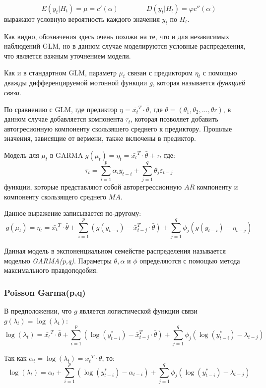 \documentclass[aps,%
12pt,%
final,%
oneside,
onecolumn,%
musixtex, %
superscriptaddress,%
centertags]{article} %
\theoremstyle{plain}
\theoremstyle{definition}
\theoremstyle{remark}
\begin{document}
$$E(y_t|H_t) = \mu = c'(\alpha) \qquad  \qquad D(y_t|H_t) = \varphi c''(\alpha)$$
выражают условную вероятность каждого значения $y_t$ по $H_t$.

Как видно, обозначения здесь очень похожи на те, что и для независимых наблюдений GLM, но в данном случае моделируются условные распределения, что является важным уточнением модели.

Как и в стандартном GLM, параметр $\mu_t$ связан с предиктором $\eta_t$ с помощью дважды дифференцируемой мотонной функции $g$, которая называется \textit{функцией связи}.

По сравнению с GLM, где предиктор $\eta = \bar{x_t}^T \cdot \bar{\theta}$, где $\theta = (\theta_1,\theta_2,\ldots,\theta r)$, в данном случае добавляется компонента $\tau_t$, которая позволяет добавить автогресионную компоненту скользяшего среднего к предиктору. Прошлые значения, зависящие от вермени, также включены в предиктор.

Модель для $\mu_t$ в GARMA $g(\mu_t) = \eta_t = \bar{x_t}^T \cdot \bar{\theta} + \tau_t$ где:
$$\tau_t = \sum\limits_{i=1}^p \alpha_i y_{t-i} +  \sum\limits_{j=1}^q \theta_j \varepsilon_{t-j}$$
функции, которые представляют собой авторегрессионную $AR$ компоненту и компоненту скользящего среднего $MA$.

Данное выражение записывается по-другому:
$$g(\mu_t) = \eta_t = \bar{x_t}^T \cdot \bar{\theta} + \sum\limits_{i=1}^p \left(g(y_{t-i})-\bar{x}_{t-j}^T \cdot \bar{\theta}\right) +  \sum\limits_{j=1}^q \phi_j \left(g(y_{t-i})-\eta_{t-j}\right)$$

Данная модель в экспоненциальном семействе распределения называется моделью \textit{GARMA(p,q)}. Параметры $\theta, \alpha$ и $\phi$ определяются с помощью метода максимального правдоподобия.

\subsubsection{Poisson Garma(p,q)}

В предположении, что $g$ является логистической функции связи $g(\lambda_t) = \log(\lambda_t)$:
$$\log(\lambda_t) = \bar{x_t}^T \cdot \bar{\theta} + \sum\limits_{i=1}^p \left(\log(y_{t-i}^*)-\bar{x}_{t-j}^T \cdot \bar{\theta}\right) +  \sum\limits_{j=1}^q \phi_j \left(\log(y_{t-i}^*)-\lambda_{t-j}\right) $$

Так как $\alpha_t = \log(\lambda_t) =  \bar{x_t}^T \cdot \bar{\theta}$, то:
$$\log(\lambda_t) = \alpha_t + \sum\limits_{i=1}^p \left(\log(y_{t-i}^*)-\alpha_{t-i}\right) +  \sum\limits_{j=1}^q \phi_j \left(\log(y_{t-i}^*)-\lambda_{t-j}\right) $$
\end{document}
